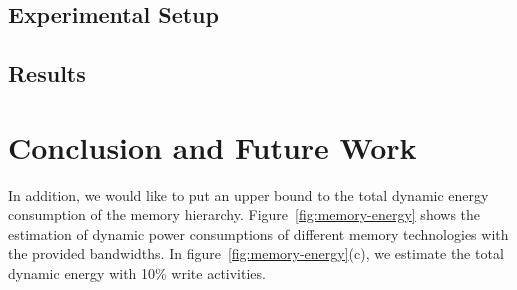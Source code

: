 \documentclass[10pt,letterpaper,singlecolumn]{article}
\begin{document}
\begin{large}
\subsection{Experimental Setup}

\subsection{Results}

\section{Conclusion and Future Work}

In addition, we would like to put an upper bound to the total dynamic energy
consumption of the memory hierarchy. Figure~\ref{fig:memory-energy} shows the
estimation of dynamic power consumptions of different memory technologies with
the provided bandwidths. In figure~\ref{fig:memory-energy}(c), we estimate the total
dynamic energy with 10\% write activities.

% 



\end{large}
\end{document}
